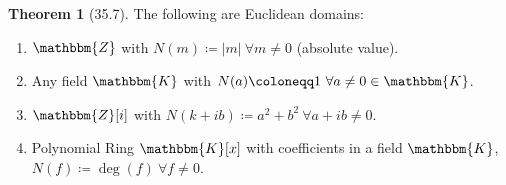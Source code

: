 \documentclass{article}
\newcommand{\Z}{\mathbbm{Z}}
\newcommand{\coleq}{\coloneqq}
\theoremstyle{definition}
\newtheorem*{thm}{Theorem}
\theoremstyle{remark}
\newcommand{\K}{\mathbbm{K}}
\begin{document}
{{            \begin{thm}[35.7]
                The following are Euclidean domains:
                \begin{enumerate}
                    \item $\Z$ with $N(m)\coleq |m| \ \forall m\neq 0$ (absolute value).
                    \item Any field $\K$ with $N(a)\coleq 1 \ \forall a\neq 0\in \K$.
                    \item $\Z[i]$ with $N(k+ib)\coleq a^2+b^2 \ \forall a+ib\neq 0$.
                    \item Polynomial Ring $\K[x]$ with coefficients in a field $\K$, $N(f)\coleq \deg(f) \ \forall f\neq 0$.
                \end{enumerate}
            \end{thm}
        
        }
    }
\end{document}
